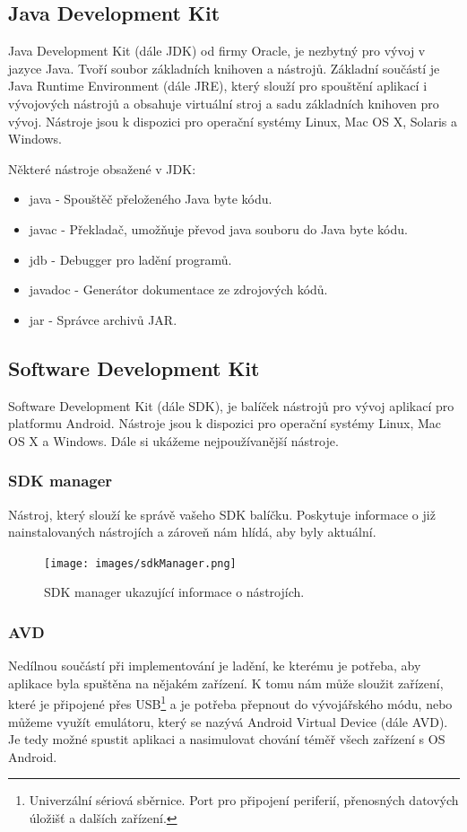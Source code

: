 \documentclass[12pt]{article}
\begin{document}
\subsection{Java Development Kit}
Java Development Kit (dále JDK) od firmy Oracle, je nezbytný pro vývoj v jazyce Java. Tvoří soubor základních knihoven a nástrojů. Základní součástí je Java Runtime Environment (dále JRE), který slouží pro spouštění aplikací i vývojových nástrojů a obsahuje virtuální stroj a sadu základních knihoven pro vývoj. Nástroje jsou k dispozici pro operační systémy  Linux, Mac OS X, Solaris a Windows.

Některé nástroje obsažené v JDK:
\begin{itemize}
\item java - Spouštěč přeloženého Java byte kódu.
\item javac - Překladač, umožňuje převod  java souboru do Java byte kódu.
\item jdb - Debugger pro ladění programů.
\item javadoc - Generátor dokumentace ze zdrojových kódů.
\item jar - Správce archivů JAR.
\end{itemize}
\subsection{Software Development Kit}
Software Development Kit (dále SDK), je balíček nástrojů pro vývoj aplikací pro platformu Android. Nástroje jsou k dispozici pro operační systémy  Linux, Mac OS X a Windows. Dále si ukážeme nejpoužívanější nástroje.
\newpage
\subsubsection{SDK manager}
Nástroj, který slouží ke správě vašeho SDK balíčku. Poskytuje informace o již nainstalovaných nástrojích a zároveň nám hlídá, aby byly aktuální.
\begin{figure}[ht]
\centerline{\texttt{[image: images/sdkManager.png]}}
\caption{SDK manager ukazující informace o nástrojích.} \label{manager}
\end{figure}
\subsubsection{AVD}
Nedílnou součástí při implementování je ladění, ke kterému je potřeba, aby aplikace byla spuštěna na nějakém zařízení. K tomu nám může sloužit zařízení, které je připojené přes USB\footnote[5]{Univerzální sériová sběrnice. Port pro připojení periferií, přenosných datových úložišť a dalších zařízení.} a je potřeba přepnout do vývojářského módu, nebo můžeme využít emulátoru, který se nazývá Android Virtual Device (dále AVD). Je tedy možné spustit aplikaci a nasimulovat chování téměř všech zařízení s OS Android.
\end{document}
